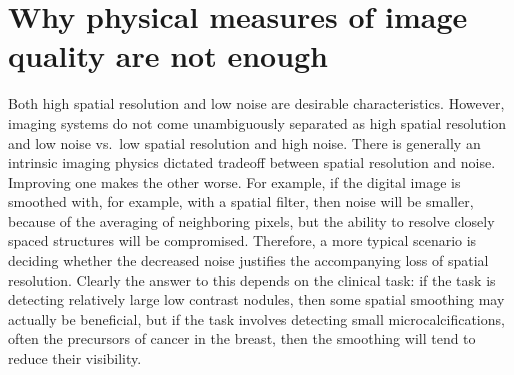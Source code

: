 \documentclass[
]{book}
\begin{document}
\hypertarget{why-physical-measures-of-image-quality-are-not-enough}{%
\section{Why physical measures of image quality are not enough}\label{why-physical-measures-of-image-quality-are-not-enough}}

Both high spatial resolution and low noise are desirable characteristics. However, imaging systems do not come unambiguously separated as high spatial resolution and low noise vs.~low spatial resolution and high noise. There is generally an intrinsic imaging physics dictated tradeoff between spatial resolution and noise. Improving one makes the other worse. For example, if the digital image is smoothed with, for example, with a spatial filter, then noise will be smaller, because of the averaging of neighboring pixels, but the ability to resolve closely spaced structures will be compromised. Therefore, a more typical scenario is deciding whether the decreased noise justifies the accompanying loss of spatial resolution. Clearly the answer to this depends on the clinical task: if the task is detecting relatively large low contrast nodules, then some spatial smoothing may actually be beneficial, but if the task involves detecting small microcalcifications, often the precursors of cancer in the breast, then the smoothing will tend to reduce their visibility.
\end{document}
